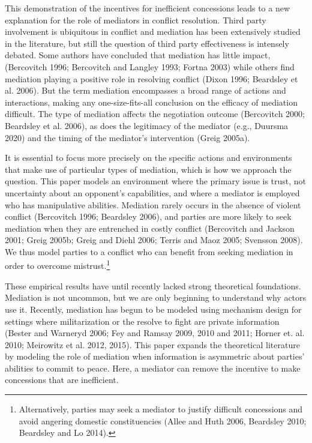 \documentclass[12pt, letterpaper]{article}
\begin{document}
This demonstration of the incentives for inefficient concessions leads to a new explanation for the role of mediators in conflict resolution. Third party involvement is ubiquitous in conflict and mediation has been extensively studied in the literature, but still the question of third party effectiveness is intensely debated.  Some authors have concluded that mediation has little impact, (Bercovitch 1996;  Bercovitch and Langley 1993; Fortna 2003) while others find mediation playing a positive role in resolving conflict (Dixon 1996; Beardsley et al. 2006).  But the term mediation encompasses a broad range of actions and interactions, making any one-size-fits-all conclusion on the efficacy of mediation difficult. The type of mediation affects the negotiation outcome (Bercovitch 2000; Beardsley et al. 2006), as does the legitimacy of the mediator (e.g., Duursma 2020) and the timing of the mediator's intervention (Greig 2005a).

It is essential to focus more precisely on the specific actions and environments that make use of particular types of mediation, which is how we approach the question. This paper models an environment where the primary issue is trust, not uncertainty about an opponent's capabilities, and where a mediator is employed who has manipulative abilities. Mediation rarely occurs in the absence of violent conflict (Bercovitch 1996; Beardsley 2006), and parties are more likely to seek mediation when they are entrenched in costly conflict (Bercovitch and Jackson 2001; Greig 2005b; Greig and Diehl 2006; Terris and Maoz 2005; Svensson 2008). We thus model parties to a conflict who can benefit from seeking mediation in order to overcome mistrust.\footnote{Alternatively, parties may seek a mediator to justify difficult concessions and avoid angering domestic constituencies (Allee and Huth 2006, Beardsley 2010; Beardsley and Lo 2014).}

These empirical results have until recently lacked strong theoretical foundations. Mediation is not uncommon, but we are only beginning to understand why actors use it. Recently, mediation has begun to be modeled using mechanism design for settings where militarization or the resolve to fight are private information (Bester and Warneryd 2006; Fey and Ramsay 2009, 2010 and 2011; Horner et. al. 2010; Meirowitz et al. 2012, 2015). This paper expands the theoretical literature by modeling the role of mediation when information is asymmetric about parties' abilities to commit to peace. Here, a mediator can remove the incentive to make concessions that are inefficient. 
\end{document}

